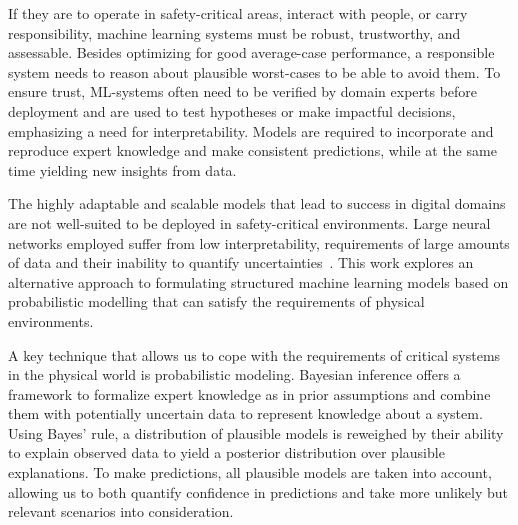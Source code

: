 If they are to operate in safety-critical areas, interact with people, or carry responsibility, machine learning systems must be robust, trustworthy, and assessable.
Besides optimizing for good average-case performance, a responsible system needs to reason about plausible worst-cases to be able to avoid them.
To ensure trust, ML-systems often need to be verified by domain experts before deployment and are used to test hypotheses or make impactful decisions, emphasizing a need for interpretability.
Models are required to incorporate and reproduce expert knowledge and make consistent predictions, while at the same time yielding new insights from data.

The highly adaptable and scalable models that lead to success in digital domains are not well-suited to be deployed in safety-critical environments.
Large neural networks employed suffer from low interpretability, requirements of large amounts of data and their inability to quantify uncertainties~\parencite{goodfellow_deep_2016}.
This work explores an alternative approach to formulating structured machine learning models based on probabilistic modelling that can satisfy the requirements of physical environments.

A key technique that allows us to cope with the requirements of critical systems in the physical world is probabilistic modeling.
Bayesian inference offers a framework to formalize expert knowledge as in prior assumptions and combine them with potentially uncertain data to represent knowledge about a system.
Using Bayes' rule, a distribution of plausible models is reweighed by their ability to explain observed data to yield a posterior distribution over plausible explanations.
To make predictions, all plausible models are taken into account, allowing us to both quantify confidence in predictions and take more unlikely but relevant scenarios into consideration.

